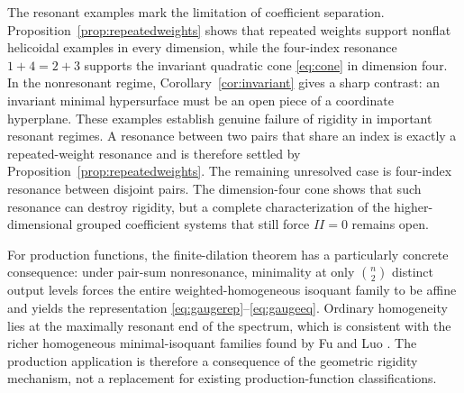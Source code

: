 \documentclass[preprint,12pt]{elsarticle}
\numberwithin{equation}{section}
\theoremstyle{definition}\newtheorem{definition}[theorem]{Definition}
\theoremstyle{remark}\newtheorem{remark}[theorem]{Remark}
\begin{document}
The resonant examples mark the limitation of coefficient separation. Proposition~\ref{prop:repeatedweights} shows that repeated weights support nonflat helicoidal examples in every dimension, while the four-index resonance $1+4=2+3$ supports the invariant quadratic cone \eqref{eq:cone} in dimension four. In the nonresonant regime, Corollary~\ref{cor:invariant} gives a sharp contrast: an invariant minimal hypersurface must be an open piece of a coordinate hyperplane. These examples establish genuine failure of rigidity in important resonant regimes. A resonance between two pairs that share an index is exactly a repeated-weight resonance and is therefore settled by Proposition~\ref{prop:repeatedweights}. The remaining unresolved case is four-index resonance between disjoint pairs. The dimension-four cone shows that such resonance can destroy rigidity, but a complete characterization of the higher-dimensional grouped coefficient systems that still force $II=0$ remains open.

For production functions, the finite-dilation theorem has a particularly concrete consequence: under pair-sum nonresonance, minimality at only $\binom n2$ distinct output levels forces the entire weighted-homogeneous isoquant family to be affine and yields the representation \eqref{eq:gaugerep}--\eqref{eq:gaugeeq}. Ordinary homogeneity lies at the maximally resonant end of the spectrum, which is consistent with the richer homogeneous minimal-isoquant families found by Fu and Luo \cite{FuLuo2025}. The production application is therefore a consequence of the geometric rigidity mechanism, not a replacement for existing production-function classifications.
\end{document}
